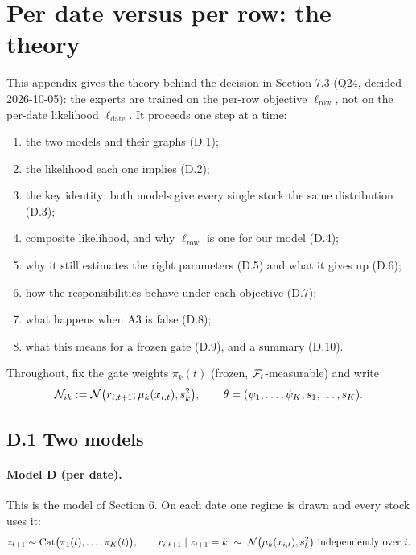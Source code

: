 \newpage
\section{Per date versus per row: the theory}\label{app:perrow}

This appendix gives the theory behind the decision in Section 7.3 (Q24, decided 2026-10-05): the experts are trained on the per-row objective $\ell_{\text{row}}$, not on the per-date likelihood $\ell_{\text{date}}$. It proceeds one step at a time:
\begin{enumerate}
  \item the two models and their graphs (D.1);
  \item the likelihood each one implies (D.2);
  \item the key identity: both models give every single stock the same distribution (D.3);
  \item composite likelihood, and why $\ell_{\text{row}}$ is one for our model (D.4);
  \item why it still estimates the right parameters (D.5) and what it gives up (D.6);
  \item how the responsibilities behave under each objective (D.7);
  \item what happens when A3 is false (D.8);
  \item what this means for a frozen gate (D.9), and a summary (D.10).
\end{enumerate}
Throughout, fix the gate weights $\pi_k(t)$ (frozen, $\mathcal{F}_t$-measurable) and write
\begin{equation*}
\mathcal{N}_{ik}:=\mathcal{N}\big(r_{i,t+1};\mu_k(x_{i,t}),s_k^2\big),\qquad\theta=(\psi_1,\dots,\psi_K,s_1,\dots,s_K).
\end{equation*}

\subsection*{D.1 Two models}

\paragraph{Model D (per date).} This is the model of Section 6. On each date one regime is drawn and every stock uses it:
\begin{equation*}
z_{t+1}\sim\text{Cat}\big(\pi_1(t),\dots,\pi_K(t)\big),\qquad r_{i,t+1}\mid z_{t+1}=k\ \sim\ \N\big(\mu_k(x_{i,t}),s_k^2\big)\ \text{independently over } i.
\end{equation*}

